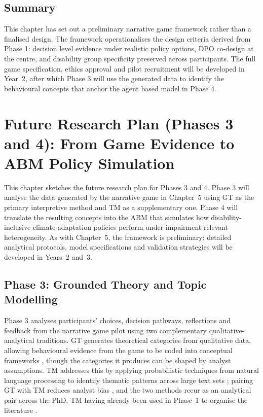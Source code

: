 \documentclass[12pt,a4paper]{report}
\begin{document}
\section{Summary}
This chapter has set out a preliminary narrative game framework rather than a finalised design. The framework operationalises the design criteria derived from Phase 1: decision level evidence under realistic policy options, DPO co-design at the centre, and disability group specificity preserved across participants. The full game specification, ethics approval and pilot recruitment will be developed in Year~2, after which Phase 3 will use the generated data to identify the behavioural concepts that anchor the agent based model in Phase 4.

\clearpage
\chapter{Future Research Plan (Phases 3 and 4): From Game Evidence to ABM Policy Simulation}
\vspace*{-1cm}

This chapter sketches the future research plan for Phases 3 and 4. Phase 3 will analyse the data generated by the narrative game in Chapter~5 using GT as the primary interpretive method and TM as a supplementary one. Phase 4 will translate the resulting concepts into the ABM that simulates how disability-inclusive climate adaptation policies perform under impairment-relevant heterogeneity. As with Chapter~5, the framework is preliminary: detailed analytical protocols, model specifications and validation strategies will be developed in Years~2 and~3.
\clearpage

\section{Phase 3: Grounded Theory and Topic Modelling}


Phase 3 analyses participants' choices, decision pathways, reflections and feedback from the narrative game pilot using two complementary qualitative-analytical traditions. GT generates theoretical categories from qualitative data, allowing behavioural evidence from the game to be coded into conceptual frameworks \cite{williams2019art,geertz2008thick}, though the categories it produces can be shaped by analyst assumptions. TM addresses this by applying probabilistic techniques from natural language processing to identify thematic patterns across large text sets \cite{Makuyana2023,grimmer2013text,jelodar2019latent}; pairing GT with TM reduces analyst bias \cite{debnath2020grounded,baumer2017comparing}, and the two methods recur as an analytical pair across the PhD, TM having already been used in Phase~1 to organise the literature \cite{debnath2020grounded}.
\end{document}
